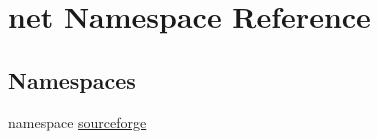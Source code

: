 \hypertarget{namespacenet}{
\section{net Namespace Reference}
\label{namespacenet}
}
\subsection*{Namespaces}
\begin{DoxyCompactItemize}
\item 
namespace \hyperlink{namespacenet_1_1sourceforge}{sourceforge}
\end{DoxyCompactItemize}
